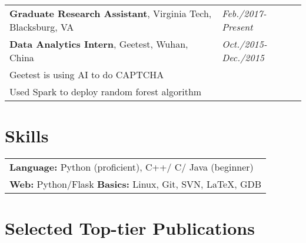 \documentclass[a4paper,10pt]{article}
\begin{document}
\begin{tabular}{p{15cm}p{3cm}}

\textbf{Graduate Research Assistant}, Virginia Tech, Blacksburg, VA & \emph{Feb./2017-Present} \\

\textbf{Data Analytics Intern}, Geetest, Wuhan, China & \emph{Oct./2015-Dec./2015} \\
\hspace{1em} Geetest is using AI to do CAPTCHA\\
\hspace{1em} Used Spark to deploy random forest algorithm
\end{tabular}

\vspace{-0.3cm}

\section{Skills}

\vspace{-0.2cm}

\begin{tabular}{p{17.5cm}}
\textbf{Language:} Python (proficient), C++/ C/ Java (beginner)\\
\textbf{Web:} Python/Flask \textbf{Basics:} Linux, Git, SVN, \LaTeX, GDB
\end{tabular}

\vspace{-0.2cm}

\section{Selected Top-tier Publications}

\vspace{-0.3cm}
\end{document}
